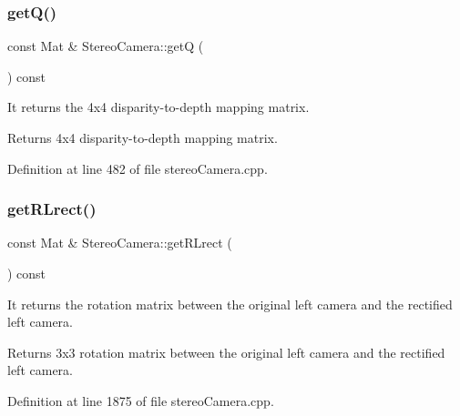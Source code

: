 \subsubsection{\texorpdfstring{getQ()}{getQ()}}
{\footnotesize\ttfamily const Mat \& Stereo\+Camera\+::getQ (\begin{DoxyParamCaption}{ }\end{DoxyParamCaption}) const}



It returns the 4x4 disparity-\/to-\/depth mapping matrix. 

\begin{DoxyReturn}{Returns}
4x4 disparity-\/to-\/depth mapping matrix. 
\end{DoxyReturn}


Definition at line 482 of file stereo\+Camera.\+cpp.


\begin{DoxyCode}{0}

\end{DoxyCode}
\mbox{\label{classStereoCamera_ab3adb747963c617fd2fe1a919b0c59c7}} 
\subsubsection{\texorpdfstring{getRLrect()}{getRLrect()}}
{\footnotesize\ttfamily const Mat \& Stereo\+Camera\+::get\+R\+Lrect (\begin{DoxyParamCaption}{ }\end{DoxyParamCaption}) const}



It returns the rotation matrix between the original left camera and the rectified left camera. 

\begin{DoxyReturn}{Returns}
3x3 rotation matrix between the original left camera and the rectified left camera. 
\end{DoxyReturn}


Definition at line 1875 of file stereo\+Camera.\+cpp.


\begin{DoxyCode}{0}

\end{DoxyCode}


